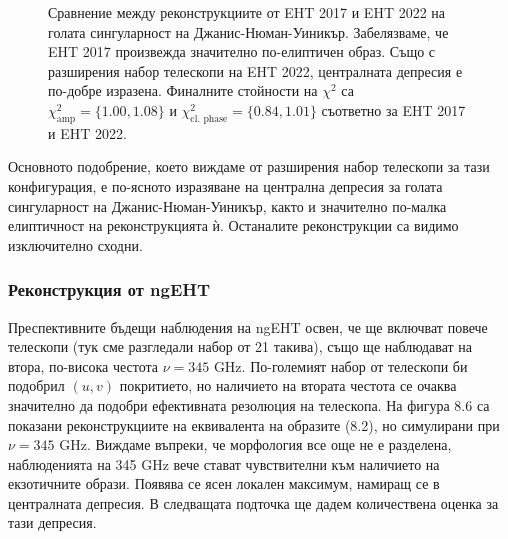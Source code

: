 \begin{figure}[h!]
\begin{subfigure}{6cm}
	\end{subfigure}
	\label{EHTIM_JNW_2017_2022}
	\caption[Сравнение между реконструкциите от EHT 2017 и EHT 2022 на голата сингуларност на Джанис-Нюман-Уиникър]{Сравнение между реконструкциите от EHT 2017 и EHT 2022 на голата сингуларност на Джанис-Нюман-Уиникър. Забелязваме, че EHT 2017 произвежда значително по-елиптичен образ. Също с разширения набор телескопи на EHT 2022, централната депресия е по-добре изразена. Финалните стойности на $\chi^2$ са $\chi^2_\text{amp} = \{1.00, 1.08\}$ и $\chi^2_\text{cl. phase} = \{0.84, 1.01\}$ съответно за EHT 2017 и EHT 2022.} 
\end{figure}

Основното подобрение, което виждаме от разширения набор телескопи за тази конфигурация, е по-ясното изразяване на централна депресия за голата сингуларност на Джанис-Нюман-Уиникър, както и значително по-малка елиптичност на реконструкцията ѝ. Останалите реконструкции са видимо изключително сходни.  
\newpage
\subsubsection{Реконструкция от ngEHT}

Преспективните бъдещи наблюдения на ngEHT освен, че ще включват повече телескопи (тук сме разгледали набор от 21 такива), също ще наблюдават на втора, по-висока честота $\nu = 345$ GHz. По-големият набор от телескопи би подобрил $(u,v)$ покритието, но наличието на втората честота се очаква значително да подобри ефективната резолюция на телескопа. На фигура 8.6 са показани реконструкциите на еквивалента на образите (8.2), но симулирани при $\nu  =345$ GHz. Виждаме въпреки, че морфология все още не е разделена, наблюденията на 345 GHz вече стават чувствителни към наличието на екзотичните образи. Появява се ясен локален максимум, намиращ се в централната депресия. В следващата подточка ще дадем количествена оценка за тази депресия.

